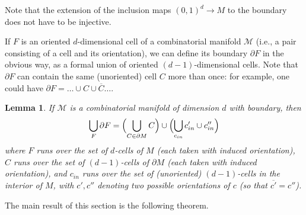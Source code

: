 \documentclass{amsart}
\newtheorem{lemma}[theorem]{Lemma}
\theoremstyle{definition}
\theoremstyle{remark}
\numberwithin{equation}{section}
\newcommand{\ov}{\overline}
\newcommand{\del}{\partial}
\newcommand{\<}{\langle}
\renewcommand{\>}{\rangle}
\newcommand{\M}{\mathcal{M}}      %
\begin{document}
Note that the extension of the  inclusion maps $(0,1)^d\to M$ to the 
boundary does not have to be injective. 

If $F$ is an oriented $d$-dimensional cell of a combinatorial manifold $\M$
(i.e., a pair consisting of a cell and its orientation), we can define
its boundary $\del F$ in the obvious way, as a formal union of oriented
$(d-1)$-dimensional cells. Note that $\del F$ can contain the same 
(unoriented) cell $C$ more than once: for example, one could have 
$\del F=\dots \cup C\cup \ov{C}\dots$. 
\begin{lemma}\label{l:delF}
If $\M$ is a combinatorial manifold  of dimension $d$ with boundary, then 
$$
\bigcup_{F}\del F=\Bigl(\bigcup_{C\in \del M} C\Bigr)
   \cup
     \Bigl(\bigcup_{c_{in}} c'_{in}\cup c''_{in}     \Bigr)
$$
where $F$ runs over the set of $d$-cells of $M$ \textup{(}each taken with
induced orientation\textup{)}, $C$ runs over the set of $(d-1)$-cells of
$\del M$ \textup{(}each taken with induced orientation\textup{)}, and
$c_{in}$ runs over the set of \textup{(}unoriented\textup{)} $(d-1)$-cells
in the interior of $M$, with $c', c''$ denoting two possible orientations
of $c$ \textup{(}so that $\ov{c'}=c''$\textup{)}. 
\end{lemma}


The main result of this section is the following theorem.
\end{document}
